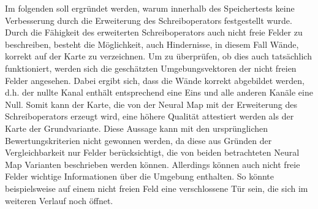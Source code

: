 Im folgenden soll ergründet werden, warum innerhalb des Speichertests keine Verbesserung durch die Erweiterung des Schreiboperators festgestellt wurde. Durch die Fähigkeit des erweiterten Schreiboperators auch nicht freie Felder zu beschreiben, besteht die Möglichkeit, auch Hindernisse, in diesem Fall Wände, korrekt auf der Karte zu verzeichnen. Um zu überprüfen, ob dies auch tatsächlich funktioniert, werden sich die geschätzten Umgebungsvektoren der nicht freien Felder angesehen. Dabei ergibt sich, dass die Wände korrekt abgebildet werden, d.h. der nullte Kanal enthält entsprechend eine Eins und alle anderen Kanäle eine Null. Somit kann der Karte, die von der Neural Map mit der Erweiterung des Schreiboperators erzeugt wird, eine höhere Qualität attestiert werden als der Karte der Grundvariante. Diese Aussage kann mit den ursprünglichen Bewertungskriterien nicht gewonnen werden, da diese aus Gründen der Vergleichbarkeit nur Felder berücksichtigt, die von beiden betrachteten Neural Map Varianten beschrieben werden können. Allerdings können auch nicht freie Felder wichtige Informationen über die Umgebung enthalten. So könnte beispielsweise auf einem nicht freien Feld eine verschlossene Tür sein, die sich im weiteren Verlauf noch öffnet.
